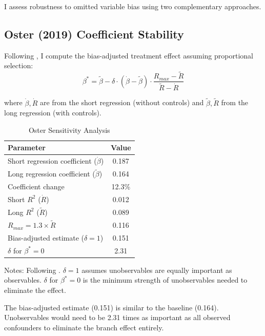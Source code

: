\documentclass[12pt]{article}
\begin{document}
I assess robustness to omitted variable bias using two complementary approaches.

\subsection{Oster (2019) Coefficient Stability}

Following \citet{oster2019}, I compute the bias-adjusted treatment effect assuming proportional selection:
\begin{equation}
\beta^* = \tilde{\beta} - \delta \cdot (\dot{\beta} - \tilde{\beta}) \cdot \frac{R_{max} - \tilde{R}}{\tilde{R} - \dot{R}}
\end{equation}

where $\dot{\beta}, \dot{R}$ are from the short regression (without controls) and $\tilde{\beta}, \tilde{R}$ from the long regression (with controls).

\begin{table}[H]
\centering
\caption{Oster Sensitivity Analysis}
\label{tab:oster}
\begin{threeparttable}
\begin{tabular}{lc}
\toprule
Parameter & Value \\
\midrule
Short regression coefficient ($\dot{\beta}$) & 0.187 \\
Long regression coefficient ($\tilde{\beta}$) & 0.164 \\
Coefficient change & 12.3\% \\
Short $R^2$ ($\dot{R}$) & 0.012 \\
Long $R^2$ ($\tilde{R}$) & 0.089 \\
\midrule
$R_{max} = 1.3 \times \tilde{R}$ & 0.116 \\
Bias-adjusted estimate ($\delta = 1$) & 0.151 \\
\midrule
$\delta$ for $\beta^* = 0$ & 2.31 \\
\bottomrule
\end{tabular}
\begin{tablenotes}
\small
\item Notes: Following \citet{oster2019}. $\delta = 1$ assumes unobservables are equally important as observables. $\delta$ for $\beta^* = 0$ is the minimum strength of unobservables needed to eliminate the effect.
\end{tablenotes}
\end{threeparttable}
\end{table}

The bias-adjusted estimate (0.151) is similar to the baseline (0.164). Unobservables would need to be 2.31 times as important as all observed confounders to eliminate the branch effect entirely.
\end{document}
